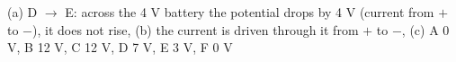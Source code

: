 (a) D $\to$ E: across the 4 V battery the potential drops by 4 V (current from $+$ to $-$), it does not rise, (b) the current is driven through it from $+$ to $-$, (c) A 0 V, B 12 V, C 12 V, D 7 V, E 3 V, F 0 V
